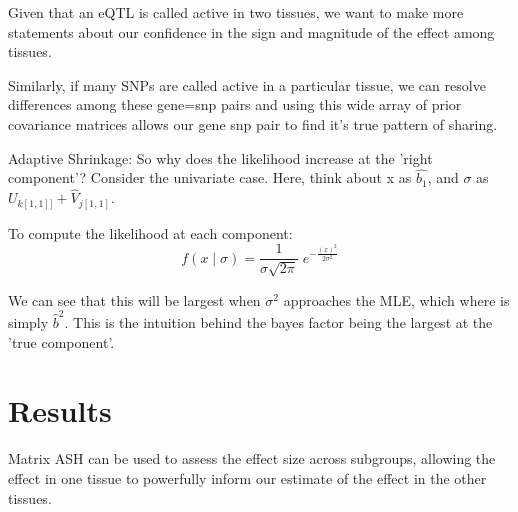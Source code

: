 \documentclass[10pt,letterpaper]{article}
\begin{document}
Given that an eQTL is called active in two tissues, we want to make more statements about our confidence in the sign and magnitude of the effect among tissues. 

Similarly, if many SNPs are called active  in a particular tissue, we can resolve differences among these gene=snp pairs  and using this wide array of prior covariance matrices allows our gene snp pair to find it's true pattern of sharing. 

\item{Adaptive Shrinkage: So why does the likelihood increase at the 'right component'?}
Consider the univariate case. Here, think about x as $\hat{b_{1}}$, and $\sigma$ as $U_{k[1,1]]} + \hat{V}_{j[1,1]}$.  

To compute the likelihood at each component: 
\begin{equation}
f(x \; | \; \sigma) = \frac{1}{\sigma\sqrt{2\pi} } \; e^{ -\frac{(x)^2}{2\sigma^2} }
\end{equation}
  
We can see that this will be largest when $\sigma^{2}$ approaches the MLE, which where is simply $\hat{b}^{2}$. 
This is the intuition behind the bayes factor being the largest at the 'true component'. 

\section*{Results}

Matrix ASH can be used to assess the effect size across subgroups, allowing the effect in one tissue to powerfully inform our estimate of the effect in the other tissues.
\end{document}
